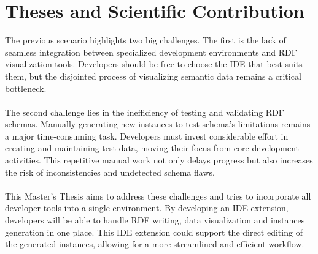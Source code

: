 \section{Theses and Scientific Contribution  \label{sec:objective}}
The previous scenario highlights two big challenges. The first is the lack of seamless integration between specialized development environments and RDF visualization tools. 
Developers should be free to choose the IDE that best suits them, but the disjointed process of visualizing semantic data remains a critical bottleneck.
\\
\\
The second challenge lies in the inefficiency of testing and validating RDF schemas. Manually generating new instances to test schema's limitations remains a major time-consuming task. Developers must invest considerable effort in creating and maintaining test data, moving their focus from core development activities. This repetitive manual work not only delays progress but also increases the risk of inconsistencies and undetected schema flaws.
\\
\\
This Master's Thesis aims to address these challenges and tries to incorporate all developer tools into a single environment.
By developing an IDE extension, developers will be able to handle RDF writing, data visualization and instances generation in one place.
This IDE extension could support the direct editing of the generated instances, allowing for a more streamlined and efficient workflow.



